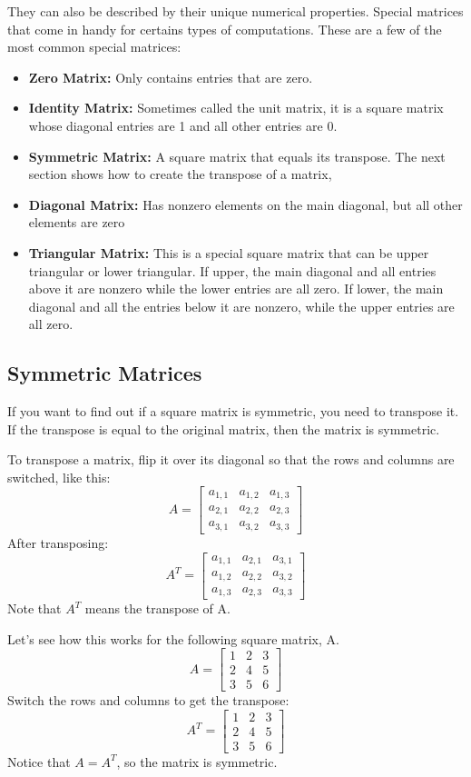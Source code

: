 They can also be described by their unique numerical properties. Special matrices that come in handy for certains types of computations. These are a few of the most common special matrices:
\begin{itemize}
	\item \textbf{Zero Matrix:} Only contains entries that are zero.
	\item \textbf{Identity Matrix:} Sometimes called the unit matrix, it is a square matrix whose diagonal entries are 1 and all other entries are 0.
	\item \textbf{Symmetric Matrix:} A square matrix that equals its transpose. The next section shows how to create the transpose of a matrix,
	\item \textbf{Diagonal Matrix:} Has nonzero elements on the main diagonal, but all other elements are zero
	\item \textbf{Triangular Matrix:} This is a special square matrix that can be upper triangular or lower triangular. If upper, the main diagonal and all entries above it are nonzero while the lower entries are all zero. If lower, the main diagonal and all the entries below it are nonzero, while the upper entries are all zero. 
\end{itemize}

\subsection{Symmetric Matrices}
If you want to find out if a square matrix is symmetric, you need to transpose it. If the transpose is equal to the original matrix, then the matrix is symmetric.

To transpose a matrix, flip it over its diagonal so that the rows and columns are switched, like this:
$$
A = \begin{bmatrix}
a_{1,1} & a_{1,2} & a_{1,3} \\
a_{2,1} & a_{2,2} & a_{2,3} \\
a_{3,1} & a_{3,2} & a_{3,3}
\end{bmatrix}
$$
After transposing:
$$
A^T = \begin{bmatrix}
a_{1,1} & a_{2,1} & a_{3,1} \\
a_{1,2} & a_{2,2} & a_{3,2} \\
a_{1,3} & a_{2,3} & a_{3,3}
\end{bmatrix}
$$
Note that $A^T$ means the transpose of A. 

Let's see how this works for the following square matrix, A.
$$
A = \begin{bmatrix}
1 & 2 & 3 \\
2 & 4 & 5 \\
3 & 5 & 6
\end{bmatrix}
$$
Switch the rows and columns to get the transpose:
$$
A^T = \begin{bmatrix}
1 & 2 & 3 \\
2 & 4 & 5 \\
3 & 5 & 6
\end{bmatrix}
$$
Notice that $A = A^T$, so the matrix is symmetric.

